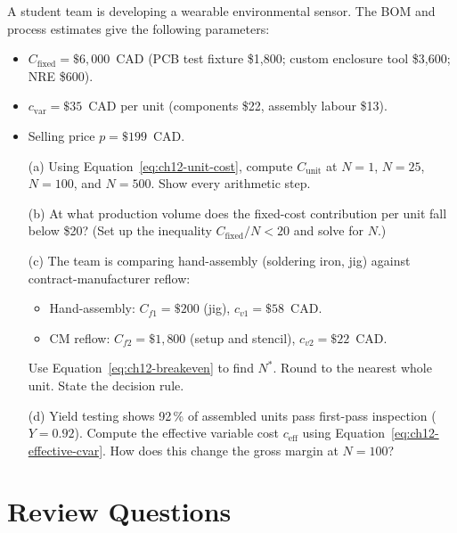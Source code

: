 A student team is developing a wearable environmental sensor.
The BOM and process estimates give the following parameters:

\begin{itemize}
  \item $C_{\text{fixed}} = \$6{,}000$~CAD (PCB test fixture \$1,800; custom
        enclosure tool \$3,600; NRE \$600).
  \item $c_{\text{var}} = \$35$~CAD per unit (components \$22, assembly
        labour \$13).
  \item Selling price $p = \$199$~CAD.
\end{itemize}

\begin{enumerate}
  \item[(a)] Using Equation~\ref{eq:ch12-unit-cost}, compute $C_{\text{unit}}$
        at $N = 1$, $N = 25$, $N = 100$, and $N = 500$.
        Show every arithmetic step.
  \item[(b)] At what production volume does the fixed-cost contribution per
        unit fall below \$20?
        (Set up the inequality $C_{\text{fixed}}/N < 20$ and solve for $N$.)
  \item[(c)] The team is comparing hand-assembly (soldering iron, jig) against
        contract-manufacturer reflow:
        \begin{itemize}
          \item Hand-assembly: $C_{f1} = \$200$ (jig), $c_{v1} = \$58$~CAD.
          \item CM reflow: $C_{f2} = \$1{,}800$ (setup and stencil),
                $c_{v2} = \$22$~CAD.
        \end{itemize}
        Use Equation~\ref{eq:ch12-breakeven} to find $N^{*}$.
        Round to the nearest whole unit.
        State the decision rule.
  \item[(d)] Yield testing shows 92\,\% of assembled units pass first-pass
        inspection ($Y = 0.92$).
        Compute the effective variable cost $c_{\text{eff}}$ using
        Equation~\ref{eq:ch12-effective-cvar}.
        How does this change the gross margin at $N = 100$?
\end{enumerate}

\section*{Review Questions}
\label{sec:ch12-review}

